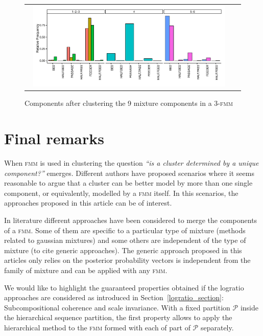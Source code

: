 \documentclass[10pt, a4paper]{article}
\theoremstyle{definition}
\newcommand{\fmm}{\textsc{fmm}\xspace}
\begin{document}
\begin{spacing}{1.9}
\begin{figure}[t]
\begin{center}
\begin{tabular}{cc}
  \includegraphics[width=0.95\textwidth]{figures/multinomial_clust3_all.pdf} \\
 \end{tabular}
 \caption{Components after clustering the 9 mixture components in a 3-\fmm}\label{multinomial_clust3}
\end{center}
\end{figure}

\section{Final remarks}\label{remarks}

When \fmm is used in clustering the question \textit{``is a cluster determined by a unique component?''} emerges. Different authors have proposed scenarios where it seems reasonable to argue that a cluster can be better model by more than one single component, or equivalently, modelled by a \fmm itself. In this scenarios, the approaches proposed in this article can be of interest.

In literature different approaches have been considered to merge the components of a \fmm. Some of them are specific to a particular type of mixture (methods related to gaussian mixtures) and some others are independent of the type of mixture (to cite generic approaches). The generic approach proposed in this articles only relies  on the posterior probability vectors is independent from the family of mixture and can be applied with any \fmm.

We would like to highlight the guaranteed properties obtained if the logratio approaches are considered as introduced in Section~\ref{logratio_section}: Subcompositional coherence and scale invariance. With a fixed partition $\mathcal{P}$ inside the hierarchical sequence partition, the first property allows to apply the hierarchical method to the \fmm formed with each of part of $\mathcal{P}$ separately.


\end{spacing}
\end{document}
